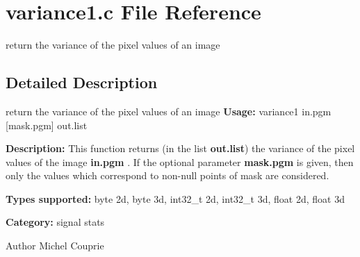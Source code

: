 \section{variance1.c File Reference}
\label{variance1_8c}


return the variance of the pixel values of an image  




\subsection{Detailed Description}
return the variance of the pixel values of an image {\bfseries Usage:} variance1 in.pgm [mask.pgm] out.list

{\bfseries Description:} This function returns (in the list {\bfseries out.list}) the variance of the pixel values of the image {\bfseries in.pgm} . If the optional parameter {\bfseries mask.pgm} is given, then only the values which correspond to non-\/null points of mask are considered.

{\bfseries Types supported:} byte 2d, byte 3d, int32\_\-t 2d, int32\_\-t 3d, float 2d, float 3d

{\bfseries Category:} signal stats

\begin{DoxyAuthor}{Author}
Michel Couprie 
\end{DoxyAuthor}
